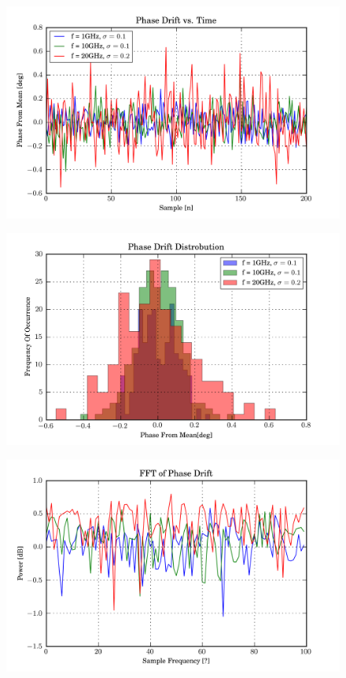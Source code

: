 \documentclass[letterpaper,10pt,english]{sphinxmanual}
\begin{document}
\begin{figure}[htbp]
\centering

\includegraphics{PhaseDriftvsTime.png}
\end{figure}
\begin{figure}[htbp]
\centering

\includegraphics{PhaseDriftDistrobution.png}
\end{figure}
\begin{figure}[htbp]
\centering

\includegraphics{FFTofPhaseDrift.png}
\end{figure}
\end{document}
